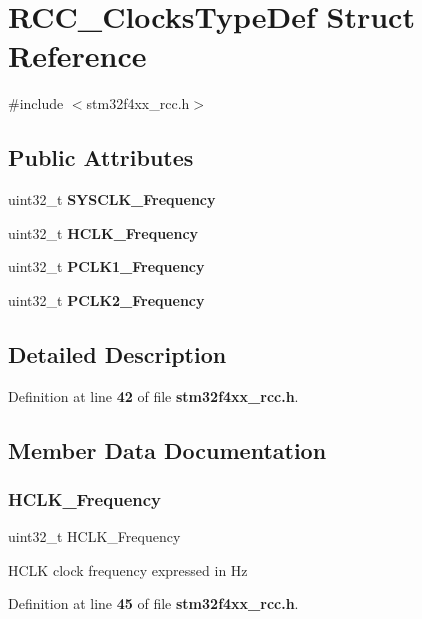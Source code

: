 \section{R\+C\+C\+\_\+\+Clocks\+Type\+Def Struct Reference}
\label{structRCC__ClocksTypeDef}


{\ttfamily \#include $<$stm32f4xx\+\_\+rcc.\+h$>$}

\subsection*{Public Attributes}
\begin{DoxyCompactItemize}
\item 
uint32\+\_\+t \textbf{ S\+Y\+S\+C\+L\+K\+\_\+\+Frequency}
\item 
uint32\+\_\+t \textbf{ H\+C\+L\+K\+\_\+\+Frequency}
\item 
uint32\+\_\+t \textbf{ P\+C\+L\+K1\+\_\+\+Frequency}
\item 
uint32\+\_\+t \textbf{ P\+C\+L\+K2\+\_\+\+Frequency}
\end{DoxyCompactItemize}


\subsection{Detailed Description}


Definition at line \textbf{ 42} of file \textbf{ stm32f4xx\+\_\+rcc.\+h}.



\subsection{Member Data Documentation}
\mbox{\label{structRCC__ClocksTypeDef_a5f9bf60f522a160aa7a878acf92ce129}} 
\subsubsection{H\+C\+L\+K\+\_\+\+Frequency}
{\footnotesize\ttfamily uint32\+\_\+t H\+C\+L\+K\+\_\+\+Frequency}

H\+C\+LK clock frequency expressed in Hz 

Definition at line \textbf{ 45} of file \textbf{ stm32f4xx\+\_\+rcc.\+h}.



